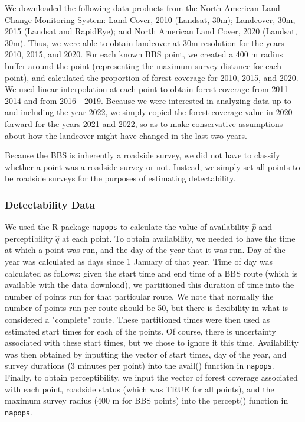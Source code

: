 \documentclass[12pt]{article}
\begin{document}
\par We downloaded the following data products from the North American Land Change Monitoring System: Land Cover, 2010 (Landsat, 30m); Landcover, 30m, 2015 (Landsat and RapidEye); and North American Land Cover, 2020 (Landsat, 30m).
Thus, we were able to obtain landcover at 30m resolution for the years 2010, 2015, and 2020. 
For each known BBS point, we created a 400 m radius buffer around the point (representing the maximum survey distance for each point), and calculated the proportion of forest coverage for 2010, 2015, and 2020. 
We used linear interpolation at each point to obtain forest coverage from 2011 - 2014 and from 2016 - 2019. 
Because we were interested in analyzing data up to and including the year 2022, we simply copied the forest coverage value in 2020 forward for the years 2021 and 2022, so as to make conservative assumptions about how the landcover might have changed in the last two years.

\par Because the BBS is inherently a roadside survey, we did not have to classify whether a point was a roadside survey or not.
Instead, we simply set all points to be roadside surveys for the purposes of estimating detectability.

\subsubsection{Detectability Data}

\par We used the R package \texttt{napops} to calculate the value of availability $\hat{p}$ and perceptibility $\hat{q}$ at each point.
To obtain availability, we needed to have the time at which a point was run, and the day of the year that it was run.
Day of the year was calculated as days since 1 January of that year.
Time of day was calculated as follows: given the start time and end time of a BBS route (which is available with the data download), we partitioned this duration of time into the number of points run for that particular route.
We note that normally the number of points run per route should be 50, but there is flexibility in what is considered a "complete" route.
These partitioned times were then used as estimated start times for each of the points. 
Of course, there is uncertainty associated with these start times, but we chose to ignore it this time.
Availability was then obtained by inputting the vector of start times, day of the year, and survey durations (3 minutes per point) into the avail() function in \texttt{napops}.
Finally, to obtain perceptibility, we input the vector of forest coverage associated with each point, roadside status (which was TRUE for all points), and the maximum survey radius (400 m for BBS points) into the percept() function in \texttt{napops}.
\end{document}
